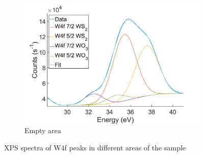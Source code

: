 \begin{figure}[!h]
\begin{center}
		\begin{subfigure}[b]{0.25\textwidth}
			\includegraphics[scale=0.2]{WSe2/XPSW4fRef.png}
			\caption{Empty area}
			\label{fig:WSe2XPSRefW}
		\end{subfigure}
		\caption{XPS spectra of W4f peaks in different areas of the sample}
		\label{fig:WSe2XPSW}
	\end{center}
\end{figure}

